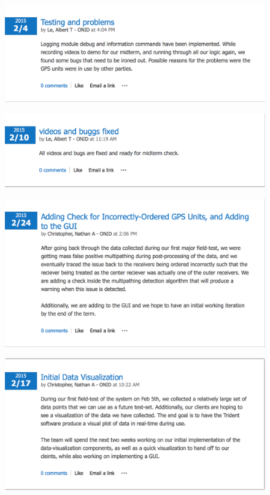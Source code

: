 \documentclass[12pt]{article}
\begin{document}
\begin{figure}[H]
\centering
\includegraphics[scale=0.5]{blog_posts/2015_2_4.png}
\label{fig:my_label}
\end{figure}

\begin{figure}[H]
\centering
\includegraphics[scale=0.5]{blog_posts/2015_2_10.png}
\label{fig:my_label}
\end{figure}

\begin{figure}[H]
\centering
\includegraphics[scale=0.5]{blog_posts/2015_2_14.png}
\label{fig:my_label}
\end{figure}

\begin{figure}[H]
\centering
\includegraphics[scale=0.5]{blog_posts/2015_2_17.png}
\label{fig:my_label}
\end{figure}
\end{document}
